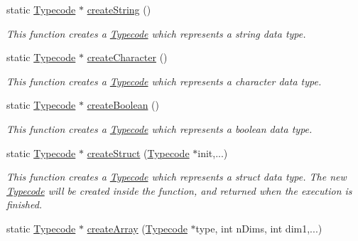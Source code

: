 \begin{DoxyCompactItemize}
static \hyperlink{class_dynamic_fast_buffers_1_1_typecode}{Typecode} $\ast$ \hyperlink{class_dynamic_fast_buffers_1_1_typecode_a_p_i_a2db3c5ee60a6365dadf728be3f9abc7f}{create\-String} ()
\begin{DoxyCompactList}\small\item\em This function creates a \hyperlink{class_dynamic_fast_buffers_1_1_typecode}{Typecode} which represents a string data type. \end{DoxyCompactList}\item 
static \hyperlink{class_dynamic_fast_buffers_1_1_typecode}{Typecode} $\ast$ \hyperlink{class_dynamic_fast_buffers_1_1_typecode_a_p_i_a8c734fb5b46829253af024a1df531aa8}{create\-Character} ()
\begin{DoxyCompactList}\small\item\em This function creates a \hyperlink{class_dynamic_fast_buffers_1_1_typecode}{Typecode} which represents a character data type. \end{DoxyCompactList}\item 
static \hyperlink{class_dynamic_fast_buffers_1_1_typecode}{Typecode} $\ast$ \hyperlink{class_dynamic_fast_buffers_1_1_typecode_a_p_i_a8020ef6471fb64de030b7e2a71258440}{create\-Boolean} ()
\begin{DoxyCompactList}\small\item\em This function creates a \hyperlink{class_dynamic_fast_buffers_1_1_typecode}{Typecode} which represents a boolean data type. \end{DoxyCompactList}\item 
static \hyperlink{class_dynamic_fast_buffers_1_1_typecode}{Typecode} $\ast$ \hyperlink{class_dynamic_fast_buffers_1_1_typecode_a_p_i_a9e8fb70edf382d83ca43d6727126d11c}{create\-Struct} (\hyperlink{class_dynamic_fast_buffers_1_1_typecode}{Typecode} $\ast$init,...)
\begin{DoxyCompactList}\small\item\em This function creates a \hyperlink{class_dynamic_fast_buffers_1_1_typecode}{Typecode} which represents a struct data type. The new \hyperlink{class_dynamic_fast_buffers_1_1_typecode}{Typecode} will be created inside the function, and returned when the execution is finished. \end{DoxyCompactList}\item 
static \hyperlink{class_dynamic_fast_buffers_1_1_typecode}{Typecode} $\ast$ \hyperlink{class_dynamic_fast_buffers_1_1_typecode_a_p_i_a2f8154355072c35f57c0238546b86c59}{create\-Array} (\hyperlink{class_dynamic_fast_buffers_1_1_typecode}{Typecode} $\ast$type, int n\-Dims, int dim1,...)

\end{DoxyCompactItemize}
